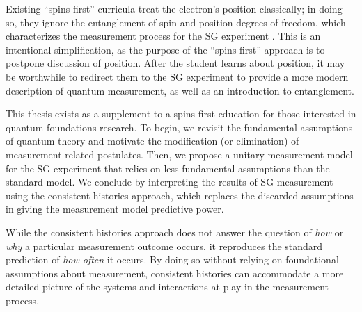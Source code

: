 Existing ``spins-first'' curricula treat the electron's position classically; in doing so, they ignore the entanglement of spin and position degrees of freedom, which characterizes the measurement process for the SG experiment \cite{rodriguez}. This is an intentional simplification, as the purpose of the ``spins-first'' approach is to postpone discussion of position. After the student learns about position, it may be worthwhile to redirect them to the SG experiment to provide a more modern description of quantum measurement, as well as an introduction to entanglement.

This thesis exists as a supplement to a spins-first education for those interested in quantum foundations research. To begin, we revisit the fundamental assumptions of quantum theory and motivate the modification (or elimination) of measurement-related postulates. Then, we propose a unitary measurement model for the SG experiment that relies on less fundamental assumptions than the standard model. We conclude by interpreting the results of SG measurement using the consistent histories approach, which replaces the discarded assumptions in giving the measurement model predictive power.

While the consistent histories approach does not answer the question of \textit{how} or \textit{why} a particular measurement outcome occurs, it reproduces the standard prediction of \textit{how often} it occurs. By doing so without relying on foundational assumptions about measurement, consistent histories can accommodate a more detailed picture of the systems and interactions at play in the measurement process.

%

